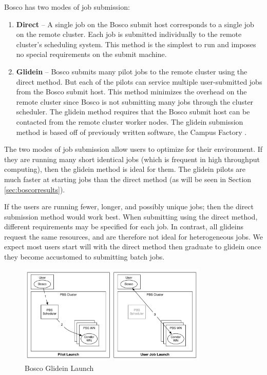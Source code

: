 Bosco has two modes of job submission:
\begin{enumerate}
	\item \textbf{Direct} -- A single job on the Bosco submit host corresponds to a single job on the remote cluster.  Each job is submitted individually to the remote cluster's scheduling system.  This method is the simplest to run and imposes no special requirements on the submit machine.
	
	\item \textbf{Glidein} -- Bosco submits many pilot jobs to the remote cluster using the direct method.  But each of the pilots can service multiple user-submitted jobs from the Bosco submit host.  This method minimizes the overhead on the remote cluster since Bosco is not submitting many jobs through the cluster scheduler.  The glidein method requires that the Bosco submit host can be contacted from the remote cluster worker nodes. \label{sec:glidein}  The glidein submission method is based off of previously written software, the Campus Factory \cite{weitzel2011campus}.
\end{enumerate}

The two modes of job submission allow users to optimize for their environment.  If they are running many short identical jobs (which is frequent in high throughput computing), then the glidein method is ideal for them.  The glidein pilots are much faster at starting jobs than the direct method (as will be seen in Section \ref{sec:boscorresults}).

If the users are running fewer, longer, and possibly unique  jobs; then the direct submission method would work best.  When submitting using the direct method, different requirements may be specified for each job.  In contrast, all glideins request the same resources, and are therefore not ideal for heterogeneous jobs.  We expect most users start will with the direct method then graduate to glidein once they become accustomed to submitting batch jobs.

\begin{figure}[h!t]
	\centering
	\includegraphics[width=0.8\textwidth]{images/BoscoGlideinLaunch.pdf}
	\caption{Bosco Glidein Launch}
	\label{fig:boscoglideinlaunch}
\end{figure}

